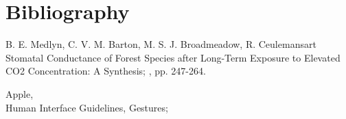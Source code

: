 \documentclass[12pt]{article} %
\begin{document}
\newpage
\section{Bibliography}
\begin{thebibliography}{99} %

\bibitem B. E. Medlyn, C. V. M. Barton, M. S. J. Broadmeadow, R. Ceulemans{art}
Stomatal Conductance of Forest Species after Long-Term Exposure to Elevated CO2 Concentration: A Synthesis;
,  pp. 247-264.

Apple,\\ Human Interface Guidelines, Gestures; \\

 
\end{thebibliography}

\end{document}
